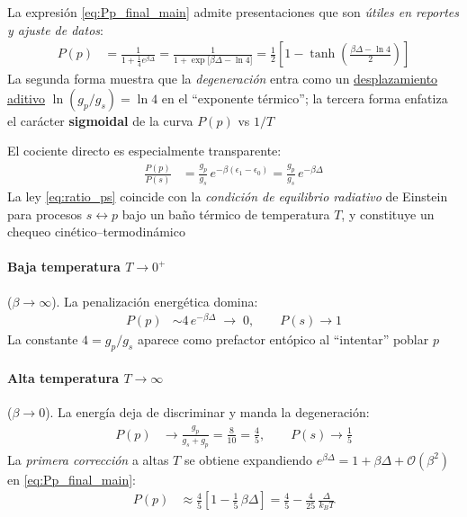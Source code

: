 \documentclass{article}
\begin{document}
La expresión \eqref{eq:Pp_final_main} admite presentaciones que son \textit{útiles en reportes y ajuste de datos}:
\begin{equation}
\begin{split}
P(p) &= \frac{1}{1+\tfrac{1}{4}e^{\beta\Delta}}
= \frac{1}{1+\exp\!\Big[\beta\Delta - \ln 4\Big]}
= \frac{1}{2}\left[1-\tanh\!\left(\frac{\beta\Delta-\ln 4}{2}\right)\right]
\end{split}\label{eq:Pp_three_forms}
\end{equation}
La segunda forma muestra que la \textit{degeneración} entra como un \underline{desplazamiento aditivo} $\ln(g_p/g_s)=\ln 4$ en el “exponente térmico”; la tercera forma enfatiza el carácter \textbf{sigmoidal} de la curva $P(p)$ vs $1/T$



El cociente directo es especialmente transparente:
\begin{equation}
\begin{split}
\frac{P(p)}{P(s)} &= \frac{g_p}{g_s}\,e^{-\beta(\epsilon_1-\epsilon_0)}
= \frac{g_p}{g_s}\,e^{-\beta\Delta}
\end{split}\label{eq:ratio_ps}
\end{equation}
La ley \eqref{eq:ratio_ps} coincide con la \textit{condición de equilibrio radiativo} de Einstein para procesos $s\leftrightarrow p$ bajo un baño térmico de temperatura $T$, y constituye un chequeo cinético–termodinámico


\paragraph{Baja temperatura $T\to 0^+$} ($\beta\to\infty$). La penalización energética domina:
\begin{equation}
\begin{split}
P(p) &\sim 4\,e^{-\beta\Delta} \;\longrightarrow\; 0,\qquad P(s)\to 1
\end{split}\label{eq:lowT_limit}
\end{equation}
La constante $4=g_p/g_s$ aparece como prefactor entópico al “intentar” poblar $p$

\paragraph{Alta temperatura $T\to\infty$} ($\beta\to 0$). La energía deja de discriminar y manda la degeneración:
\begin{equation}
\begin{split}
P(p) &\to \frac{g_p}{g_s+g_p}=\frac{8}{10}=\frac{4}{5},\qquad
P(s)\to \frac{1}{5}
\end{split}\label{eq:highT_limit}
\end{equation}
La \textit{primera corrección} a altas $T$ se obtiene expandiendo $e^{\beta\Delta}=1+\beta\Delta+\mathcal{O}(\beta^2)$ en \eqref{eq:Pp_final_main}:
\begin{equation}
\begin{split}
P(p) &\approx \frac{4}{5}\left[1 - \frac{1}{5}\,\beta\Delta\right]
= \frac{4}{5} - \frac{4}{25}\,\frac{\Delta}{k_B T}
\end{split}\label{eq:highT_expansion}
\end{equation}
\end{document}
